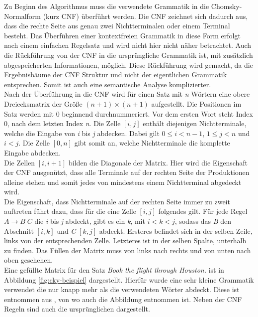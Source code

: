 Zu Beginn des Algorithmus muss die verwendete Grammatik in die Chomsky-Normalform (kurz CNF) überführt werden. Die CNF zeichnet sich dadurch aus, dass die rechte Seite aus genau zwei Nichtterminalen oder einem Terminal besteht. Das Überführen einer kontextfreien Grammatik in diese Form erfolgt nach einem einfachen Regelsatz und wird nicht hier nicht näher betrachtet. Auch die Rückführung von der CNF in die ursprüngliche Grammatik ist, mit zusätzlich abgespeicherten Informationen, möglich. Diese Rückführung wird gemacht, da die Ergebnisbäume der CNF Struktur und nicht der eigentlichen Grammatik entsprechen. Somit ist auch eine semantische Analyse komplizierter. \\
Nach der Überführung in die CNF wird für einen Satz mit \textit{n} Wörtern eine obere Dreiecksmatrix der Größe \((n+1) \times (n+1) \) aufgestellt. Die Positionen im Satz werden mit 0 beginnend durchnummeriert. Vor dem ersten Wort steht Index 0, nach dem letzten Index \textit{n}. Die Zelle \([i, j]\) enthält diejenigen Nichtterminale, welche die Eingabe von \textit{i} bis \textit{j} abdecken. Dabei gilt \( 0 \leq i < n-1 \), \( 1 \leq j < n \) und \(i < j\). Die Zelle \([0, n]\) gibt somit an, welche Nichtterminale die komplette Eingabe abdecken.\\
Die Zellen \([i, i+1]\) bilden die Diagonale der Matrix. Hier wird die Eigenschaft der CNF ausgenützt, dass alle Terminale auf der rechten Seite der Produktionen alleine stehen und somit jedes von mindestens einem Nichtterminal abgedeckt wird.\\
Die Eigenschaft, dass Nichtterminale auf der rechten Seite immer zu zweit auftreten führt dazu, dass für die eine Zelle \([i, j]\) folgendes gilt. Für jede Regel \( A \to B\;C \) die \textit{i} bis \textit{j} abdeckt, gibt es ein \textit{k}, mit \( i < k < j\), sodass das \textit{B} den Abschnitt \([i, k]\) und \textit{C} \([k, j]\) abdeckt. Ersteres befindet sich in der selben Zeile, links von der entsprechenden Zelle. Letzteres ist in der selben Spalte, unterhalb zu finden. Das Füllen der Matrix muss von links nach rechts und von unten nach oben geschehen.\\
Eine gefüllte Matrix für den Satz \textit{Book the flight through Houston.} ist in Abbildung \ref{fig:cky-beispiel} dargestellt. Hierfür wurde eine sehr kleine Grammatik verwendet die nur knapp mehr als die verwendeten Wörter abdeckt. Diese ist entnommen aus %
, von wo auch die Abbildung entnommen ist. Neben der CNF Regeln sind auch die ursprünglichen dargestellt.

